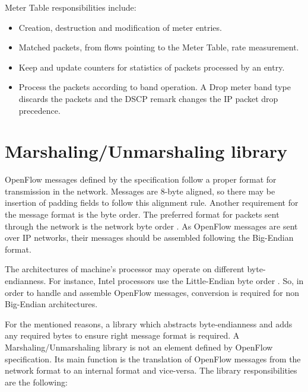     Meter Table responsibilities include:

    \begin{itemize}
    
    \item Creation, destruction and modification of meter entries.
    
    \item Matched packets, from flows pointing to the Meter Table, rate measurement. 
    
    \item Keep and update counters for statistics of packets processed by an entry.
    
    \item Process the packets according to band operation. A Drop meter band type discards the packets and the DSCP remark changes the IP packet drop precedence. 
    
    \end{itemize}

    \section{Marshaling/Unmarshaling library}
    \label{(un)pack}
    OpenFlow messages defined by the specification follow a proper format for transmission in the network. Messages are 8-byte aligned, so there may be insertion of padding fields to follow this alignment rule. Another requirement for the message format is the byte order. The preferred format for packets sent through the network is the network byte order \cite{rfc1700}. As OpenFlow messages are sent over IP networks, their messages should be assembled following the Big-Endian format.
    
    The architectures of machine's processor may operate on different byte-endianness. For instance, Intel processors use the Little-Endian byte order \cite{little-endian}. So, in order to handle and assemble OpenFlow messages, conversion is required for non Big-Endian architectures.     
    
    For the mentioned reasons, a library which abstracts byte-endianness and adds any required bytes to ensure right message format is required. A Marshaling/Unmarshaling library is not an element defined by OpenFlow specification. Its main function is the translation of OpenFlow messages from the network format to an internal format and vice-versa. The library responsibilities are the following:
    
